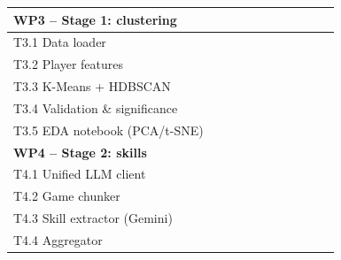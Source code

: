 \documentclass[11pt, a4paper, oneside, openany]{report}
\begin{document}
\begin{table}[H]
\begin{tabular}{|p{4.0cm}|c|c|c|c|c|c|c|c|c|c|}
\hline
\multicolumn{11}{|l|}{\textbf{WP3 -- Stage 1: clustering}} \\
\hline
T3.1 Data loader                &                    &                    & \cellcolor{wpcrit} &                    &                    &                    &                    &                    &                    &                    \\
T3.2 Player features            &                    &                    & \cellcolor{wpcrit} &                    &                    &                    &                    &                    &                    &                    \\
T3.3 K-Means + HDBSCAN          &                    &                    & \cellcolor{wpcrit} & \cellcolor{wpcrit} &                    &                    &                    &                    &                    &                    \\
T3.4 Validation \& significance &                    &                    &                    & \cellcolor{wpcrit} &                    &                    &                    &                    &                    &                    \\
T3.5 EDA notebook (PCA/t-SNE)   &                    &                    &                    & \cellcolor{wplight}&                    &                    &                    &                    &                    &                    \\
\hline
\multicolumn{11}{|l|}{\textbf{WP4 -- Stage 2: skills}} \\
\hline
T4.1 Unified LLM client         &                    &                    &                    & \cellcolor{wpcrit} &                    &                    &                    &                    &                    &                    \\
T4.2 Game chunker               &                    &                    &                    & \cellcolor{wpcrit} &                    &                    &                    &                    &                    &                    \\
T4.3 Skill extractor (Gemini)   &                    &                    &                    & \cellcolor{wpcrit} &                    &                    &                    &                    &                    &                    \\
T4.4 Aggregator                 &                    &                    &                    & \cellcolor{wpcrit} &                    &                    &                    &                    &                    &                    \\

\end{tabular}
\end{table}
\end{document}
